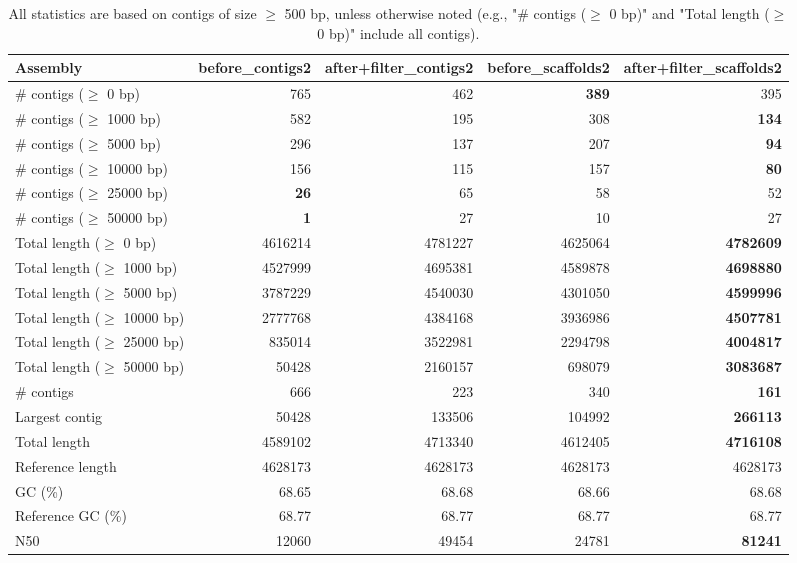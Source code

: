 \documentclass[12pt,a4paper]{article}
\begin{document}
\begin{table}[ht]
\begin{center}
\caption{All statistics are based on contigs of size $\geq$ 500 bp, unless otherwise noted (e.g., "\# contigs ($\geq$ 0 bp)" and "Total length ($\geq$ 0 bp)" include all contigs).}
\begin{tabular}{|l*{4}{|r}|}
\hline
Assembly & before\_contigs2 & after+filter\_contigs2 & before\_scaffolds2 & after+filter\_scaffolds2 \\ \hline
\# contigs ($\geq$ 0 bp) & 765 & 462 & {\bf 389} & 395 \\ \hline
\# contigs ($\geq$ 1000 bp) & 582 & 195 & 308 & {\bf 134} \\ \hline
\# contigs ($\geq$ 5000 bp) & 296 & 137 & 207 & {\bf 94} \\ \hline
\# contigs ($\geq$ 10000 bp) & 156 & 115 & 157 & {\bf 80} \\ \hline
\# contigs ($\geq$ 25000 bp) & {\bf 26} & 65 & 58 & 52 \\ \hline
\# contigs ($\geq$ 50000 bp) & {\bf 1} & 27 & 10 & 27 \\ \hline
Total length ($\geq$ 0 bp) & 4616214 & 4781227 & 4625064 & {\bf 4782609} \\ \hline
Total length ($\geq$ 1000 bp) & 4527999 & 4695381 & 4589878 & {\bf 4698880} \\ \hline
Total length ($\geq$ 5000 bp) & 3787229 & 4540030 & 4301050 & {\bf 4599996} \\ \hline
Total length ($\geq$ 10000 bp) & 2777768 & 4384168 & 3936986 & {\bf 4507781} \\ \hline
Total length ($\geq$ 25000 bp) & 835014 & 3522981 & 2294798 & {\bf 4004817} \\ \hline
Total length ($\geq$ 50000 bp) & 50428 & 2160157 & 698079 & {\bf 3083687} \\ \hline
\# contigs & 666 & 223 & 340 & {\bf 161} \\ \hline
Largest contig & 50428 & 133506 & 104992 & {\bf 266113} \\ \hline
Total length & 4589102 & 4713340 & 4612405 & {\bf 4716108} \\ \hline
Reference length & 4628173 & 4628173 & 4628173 & 4628173 \\ \hline
GC (\%) & 68.65 & 68.68 & 68.66 & 68.68 \\ \hline
Reference GC (\%) & 68.77 & 68.77 & 68.77 & 68.77 \\ \hline
N50 & 12060 & 49454 & 24781 & {\bf 81241} \\ \hline

\end{tabular}
\end{center}
\end{table}
\end{document}
